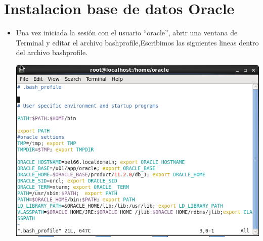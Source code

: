 

\section{Instalacion base de datos Oracle} 
\begin{itemize}
	\item Una vez iniciada la sesión con el usuario “oracle”, abrir una ventana de Terminal y editar el archivo
bashprofile,Escribimos las siguientes lineas dentro del archivo bashprofile.
	\begin{center}
	\includegraphics[width=14cm]{./Imagenes/img44} 
	\end{center}
	

\end{itemize}
